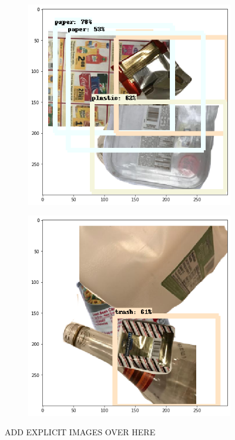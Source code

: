 \documentclass{article}
\begin{document}
\begin{figure}[h!]
    \centering
    \begin{subfigure}{0.3\linewidth}
    \includegraphics[width=\linewidth]{data/images/04_random_collage/Output_1.png}
    \end{subfigure}
    \begin{subfigure}{0.3\linewidth}
    \includegraphics[width=\linewidth]{data/images/04_random_collage/Output_2.png}
    \end{subfigure}
    \label{fig:random_collage}
     \caption{ADD EXPLICIT IMAGES OVER HERE}
\end{figure}
\end{document}
